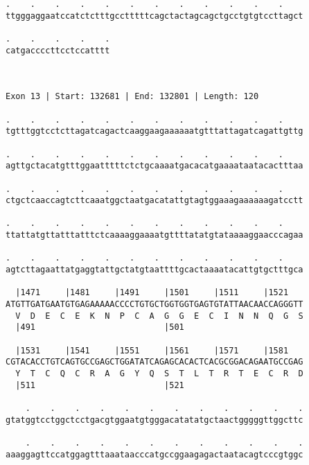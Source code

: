\documentclass{article}
\begin{document}
\begin{Verbatim}
.    .    .    .    .    .    .    .    .    .    .    .    
ttgggaggaatccatctctttgcctttttcagctactagcagctgcctgtgtccttagct
                                                            
.    .    .    .    .
catgaccccttcctccatttt
                     
                     
 
Exon 13 | Start: 132681 | End: 132801 | Length: 120
 
.    .    .    .    .    .    .    .    .    .    .    .    
tgtttggtcctcttagatcagactcaaggaagaaaaaatgtttattagatcagattgttg
                                                            
.    .    .    .    .    .    .    .    .    .    .    .    
agttgctacatgtttggaatttttctctgcaaaatgacacatgaaaataatacactttaa
                                                            
.    .    .    .    .    .    .    .    .    .    .    .    
ctgctcaaccagtcttcaaatggctaatgacatattgtagtggaaagaaaaaagatcctt
                                                            
.    .    .    .    .    .    .    .    .    .    .    .    
ttattatgttatttatttctcaaaaggaaaatgttttatatgtataaaaggaacccagaa
                                                            
.    .    .    .    .    .    .    .    .    .    .    .    
agtcttagaattatgaggtattgctatgtaattttgcactaaaatacattgtgctttgca
                                                            
  |1471     |1481     |1491     |1501     |1511     |1521   
ATGTTGATGAATGTGAGAAAAACCCCTGTGCTGGTGGTGAGTGTATTAACAACCAGGGTT
  V  D  E  C  E  K  N  P  C  A  G  G  E  C  I  N  N  Q  G  S
  |491                          |501                        
  
  |1531     |1541     |1551     |1561     |1571     |1581   
CGTACACCTGTCAGTGCCGAGCTGGATATCAGAGCACACTCACGCGGACAGAATGCCGAG
  Y  T  C  Q  C  R  A  G  Y  Q  S  T  L  T  R  T  E  C  R  D
  |511                          |521                        
  
    .    .    .    .    .    .    .    .    .    .    .    .
gtatggtcctggctcctgacgtggaatgtgggacatatatgctaactgggggttggcttc
                                                            
    .    .    .    .    .    .    .    .    .    .    .    .
aaaggagttccatggagtttaaataacccatgccggaagagactaatacagtcccgtggc
                                                            

\end{Verbatim}
\end{document}
